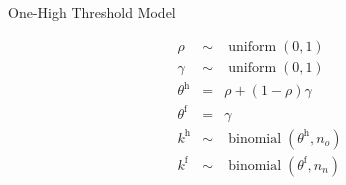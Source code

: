 \documentclass[10pt]{beamer}
\begin{document}
\begin{frame}[fragile]{One-High Threshold Model}

    \vspace{-1em}
	\begin{minipage}{0.32\textwidth}
		\begin{eqnarray*}
			\rho &\sim& \operatorname{uniform}\left(0, 1\right) \\
			\gamma &\sim&\operatorname{uniform}\left(0, 1\right) \\
			\theta^\mathrm{h} &=& {\rho} + {\left(1-\rho\right)\gamma} \\
			\theta^\mathrm{f} &=& {\gamma} \\
			k^\mathrm{h} &\sim& \operatorname{binomial}\left(\theta^\mathrm{h}, n_o\right) \\
			k^\mathrm{f} &\sim& \operatorname{binomial}\left(\theta^\mathrm{f}, n_n\right)
		\end{eqnarray*}
		

\end{minipage}
\end{frame}
\end{document}
